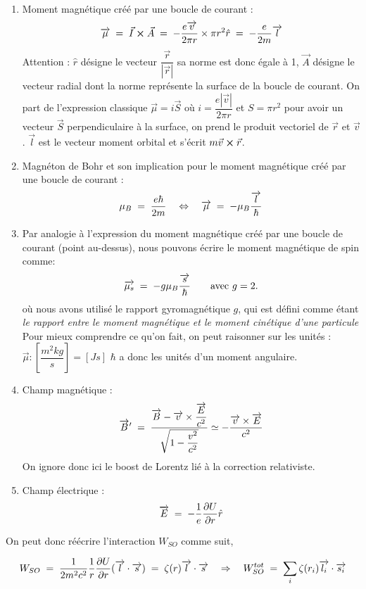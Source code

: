 \begin{enumerate}
    \item Moment magnétique créé par une boucle de courant : 
    \[
        \overrightarrow{\mu} \; = \; \vec{I}\cross \vec{A} \; = \; -\dfrac{e\overrightarrow{v}}{2\pi r}\times \pi r^2\hat{r} \; = \; -\dfrac{e}{2m}\overrightarrow{l}
    \]
    Attention : $\hat{r}$ désigne le vecteur $\dfrac{\vec{r}}{|\vec{r}|}$ sa norme est donc égale à 1, $\vec{A}$ désigne le vecteur radial dont la norme représente la surface de la boucle de courant. On part de l'expression classique $\vec{\mu} = i\vec{S}$ où $i = \dfrac{e|\vec{v}|}{2\pi r}$ et $S = \pi r^2$ pour avoir un vecteur $\vec{S}$ perpendiculaire à la surface, on prend le produit vectoriel de $\vec{r}$ et $\vec{v}$. $\vec{l}$ est le vecteur moment orbital et s'écrit $m\vec{v}\cross\vec{r}$.
    \item Magnéton de Bohr et son implication pour le moment magnétique créé par une boucle de courant : 
    \[
        \mu_B \; = \; \dfrac{e\hbar}{2m} \quad \Leftrightarrow \quad \overrightarrow{\mu} \; = \; -\mu_B\dfrac{\overrightarrow{l}}{\hbar}
    \]
    \item Par analogie à l'expression du moment magnétique créé par une boucle de courant (point au-dessus), nous pouvons écrire le moment magnétique de spin comme:
    \[
        \overrightarrow{\mu_s} \; = \; -g\mu_B\dfrac{\overrightarrow{s}}{\hbar} \qquad \textrm{avec } g=2.
    \]
    où nous avons utilisé le rapport gyromagnétique $g$, qui est défini comme étant \textit{le rapport entre le moment magnétique  et le moment cinétique d'une particule}\\
    Pour mieux comprendre ce qu'on fait, on peut raisonner sur les unités : $\vec{\mu} : [\dfrac{m^2kg}{s}] = [Js]$ $\hbar$ a donc les unités d'un moment angulaire.
    \item Champ magnétique :
    \[
        \overrightarrow{B}' \; = \; \dfrac{\overrightarrow{B} - \overrightarrow{v}\times \dfrac{\overrightarrow{E}}{c^2}}{\sqrt{1-\dfrac{v^2}{c^2}}} \simeq -\dfrac{\overrightarrow{v}\times \overrightarrow{E}}{c^2}
    \]
    On ignore donc ici le boost de Lorentz lié à la correction relativiste.
    \item Champ électrique :
    \[
        \overrightarrow{E} \; = \;  -\dfrac{1}{e}\dfrac{\partial U}{\partial r}\hat{r}
    \]
\end{enumerate}

On peut donc réécrire l'interaction $W_{SO}$ comme suit, 

\begin{equation}
    W_{SO} \; = \;  \dfrac{1}{2m^2c^2}\dfrac{1}{r}\dfrac{\partial U}{\partial r}(\overrightarrow{l}\cdot\overrightarrow{s}) \; = \;  \zeta(r)\overrightarrow{l}\cdot\overrightarrow{s} 
    \quad\Rightarrow\quad 
    W_{SO}^{tot} \; = \; \sum_i\zeta(r_i)\overrightarrow{l_i}\cdot\overrightarrow{s_i}
    \label{eq:Hamilt_SO}
\end{equation}

